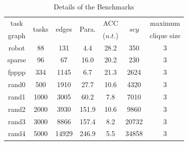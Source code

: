 \documentclass[10pt,journal]{IEEEtran}
\begin{document}
\begin{table}[!h]
\renewcommand{\arraystretch}{1.1}
\caption{Details of the Benchmarks}
\centering
\begin{tabular}{c|c|c|c|c|c|c}
\hline
\hline

task    &\multicolumn{1}{c|}{\multirow{2}{*}{tasks}}     &\multicolumn{1}{c|}{\multirow{2}{*}{edges}}     &\multicolumn{1}{c|}{\multirow{2}{*}{Para. }}  &ACC  &\multicolumn{1}{c|}{\multirow{2}{*}{$scy$}}  &\hspace{-0.3em}maximum \hspace{-0.3em}    \\
graph   &                                            &           &        & ($u.t.$)     &   &\hspace{-0.3em}clique size\hspace{-0.3em}         \\
\hline
\hline

robot   &88   &131     &4.4 &28.2  &350 &3 \\

sparse  &96   &67    &16.0  &20.2 &230 &3  \\

fpppp   &334   &1145    &6.7  &21.3 &2624 &3    \\

rand0  &500   &1910    &27.7  &10.6  &4320  &3  \\

rand1  &1000   &3005   &60.2  &7.8 &7010 &3 \\

rand2   &2000   &3930   &151.9  &10.6 &9860 &3  \\

rand3   &3000   &8866    &157.4 &8.2 &20732 &3  \\

rand4   &5000   &14929   &246.9  &5.5 &34858 &3  \\

\hline
\hline
\end{tabular}
\label{table:detail}
\end{table}

\end{document}
